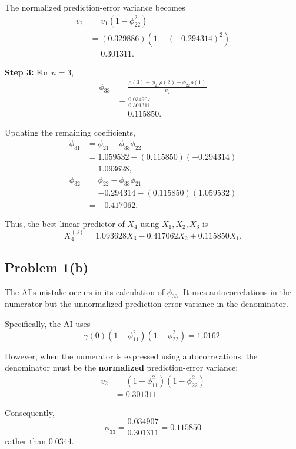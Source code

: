\documentclass[11pt]{article}
\begin{document}
The normalized prediction-error variance becomes
\[
\begin{aligned}
v_2
&=v_1(1-\phi_{22}^2)\\
&=(0.329886)(1-(-0.294314)^2)\\
&=0.301311.
\end{aligned}
\]

\textbf{Step 3:} For \(n=3\),
\[
\begin{aligned}
\phi_{33}
&=\frac{\rho(3)-\phi_{21}\rho(2)
-\phi_{22}\rho(1)}{v_2}\\
&=\frac{0.034907}{0.301311}\\
&=\boxed{0.115850}.
\end{aligned}
\]

Updating the remaining coefficients,
\[
\begin{aligned}
\phi_{31}
&=\phi_{21}-\phi_{33}\phi_{22}\\
&=1.059532-(0.115850)(-0.294314)\\
&=\boxed{1.093628},
\\[6pt]
\phi_{32}
&=\phi_{22}-\phi_{33}\phi_{21}\\
&=-0.294314-(0.115850)(1.059532)\\
&=\boxed{-0.417062}.
\end{aligned}
\]

Thus, the best linear predictor of \(X_4\)
using \(X_1,X_2,X_3\) is
\[
\boxed{
X_4^{(3)}
=1.093628X_3-0.417062X_2+0.115850X_1.
}
\]

\subsection*{Problem 1(b)}

The AI's mistake occurs in its calculation of
\(\phi_{33}\). It uses autocorrelations in the
numerator but the unnormalized prediction-error
variance in the denominator.

Specifically, the AI uses
\[
\gamma(0)(1-\phi_{11}^2)(1-\phi_{22}^2)
=1.0162.
\]

However, when the numerator is expressed
using autocorrelations, the denominator must
be the \textbf{normalized} prediction-error
variance:
\[
\begin{aligned}
v_2
&=(1-\phi_{11}^2)(1-\phi_{22}^2)\\
&=\boxed{0.301311}.
\end{aligned}
\]

Consequently,
\[
\boxed{
\phi_{33}
=\frac{0.034907}{0.301311}
=0.115850
}
\]
rather than \(0.0344\).
\end{document}
